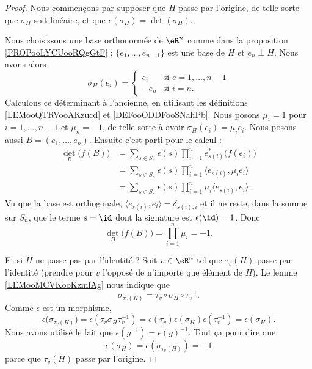 \begin{proof}
    Nous commençons par supposer que \( H\) passe par l'origine, de telle sorte que \( \sigma_H\) soit linéaire, et que \( \epsilon(\sigma_H)=\det(\sigma_H)\).

    Nous choisissons une base orthonormée de \( \eR^n\) comme dans la proposition \ref{PROPooLYCUooRQgGtF} : \( \{ e_1,\ldots, e_{n-1} \}\) est une base de \( H\) et \( e_n\perp H\). Nous avons alors
    \begin{equation}
        \sigma_H(e_i)=\begin{cases}
            e_i    &   \text{si } e=1,\ldots, n-1\\
            -e_{n}    &    \text{si } i=n.
        \end{cases}
    \end{equation}
    Calculons ce déterminant à l'ancienne, en utilisant les définitions \ref{LEMooQTRVooAKzucd} et \ref{DEFooODDFooSNahPb}. Nous posons \( \mu_i=1\) pour \( i=1,\ldots, n-1\) et \( \mu_n=-1\), de telle sorte à avoir \( \sigma_H(e_i)=\mu_ie_i\). Nous posons aussi \( B=(e_1,\ldots, e_n)\). Ensuite c'est parti pour le calcul :
    \begin{subequations}
        \begin{align}
            \det_B\big( f(B) \big)&=\sum_{s\in S_n}\epsilon(s)\prod_{i=1}^ne^*_{s(i)}\big( f(e_i) \big)\\
            &=\sum_{s\in S_n}\epsilon(s)\prod_{i=1}^n\langle e_{s(i)}, \mu_ie_i\rangle \\
            &=\sum_{s\in S_n}\epsilon(s)\prod_{i=1}^n\mu_i\langle e_{s(i)}, e_i\rangle.
        \end{align}
    \end{subequations}
    Vu que la base est orthogonale, \( \langle e_{s(i)}, e_i\rangle =\delta_{s(i), i}\) et il ne reste, dans la somme sur \( S_n\), que le terme \( s=\id\) dont la signature est \( \epsilon(\id)=1\). Donc
    \begin{equation}
        \det_B\big( f(B) \big)=\prod_{i=1}^n\mu_i=-1.
    \end{equation}

    Et si \( H\) ne passe pas par l'identité ? Soit \( v\in \eR^n\) tel que \( \tau_v(H)\) passe par l'identité (prendre pour \( v\) l'opposé de n'importe que élément de \( H\)). Le lemme \ref{LEMooMCVKooKzmlAg} nous indique que
    \begin{equation}
        \sigma_{\tau_v(H)}=\tau_v\circ \sigma_H\circ \tau_v^{-1}.
    \end{equation}
    Comme \( \epsilon\) est un morphisme,
    \begin{equation}
        \epsilon\big( \sigma_{\tau_v(H)} \big)=\epsilon(\tau_v\sigma_H\tau_v^{-1})=\epsilon(\tau_v)\epsilon(\sigma_H)\epsilon(\tau_v^{-1})=\epsilon(\sigma_H).
    \end{equation}
    Nous avons utilisé le fait que \( \epsilon(g^{-1})=\epsilon(g)^{-1}\). Tout ça pour dire que
    \begin{equation}
        \epsilon(\sigma_H)=\epsilon(\sigma_{\tau_v(H)})=-1
    \end{equation}
    parce que \( \tau_v(H)\) passe par l'origine.
\end{proof}


